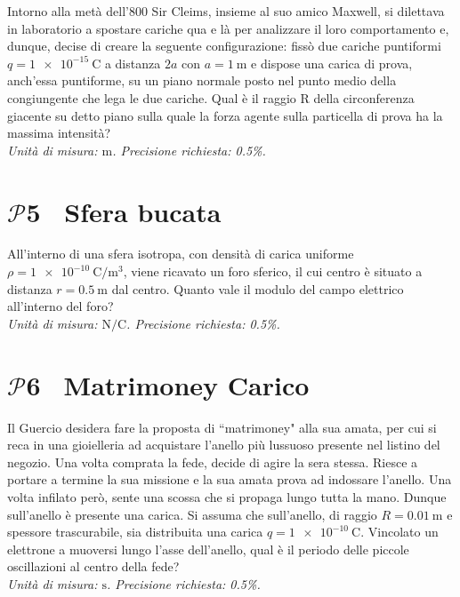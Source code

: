 \documentclass[a4paper,12pt]{article}
\newcommand{\problemtitle}[1]{
  \noindent
  \textbf{\Large #1}\hspace{0.5em}
  \raisebox{0.6ex}{\rule{\linewidth - \widthof{\textbf{\Large #1}} - 0.6em}{0.4pt}}%
}
\begin{document}
Intorno alla metà dell'800 Sir Cleims, insieme al suo amico Maxwell, si dilettava in laboratorio a spostare cariche qua e là per analizzare il loro comportamento e, dunque,  decise di creare la seguente configurazione: fissò due cariche puntiformi $q=\SI{1e-15}{\coulomb}$ a distanza $2a$ con $a=\SI{1}{\meter}$ e dispose una carica di prova, anch'essa puntiforme, su un piano normale posto nel punto medio della congiungente che lega le due cariche. Qual è il raggio R della circonferenza giacente su detto piano sulla quale  la forza agente sulla particella di prova ha la massima intensità?\\

\textit{Unità di misura: $\si{\meter}$. Precisione richiesta: 0.5\%.}

\section*{\problemtitle{$\mathcal{P}${\small{5}} \ Sfera bucata}}

All’interno di una sfera isotropa, con densità di carica uniforme $\rho=\SI{1e-10}{\coulomb\per\meter\cubed}$, viene ricavato un foro sferico, il cui centro è situato a distanza $r=\SI{0.5}{\meter}$ dal centro. Quanto vale il modulo del campo elettrico all'interno del foro?\\

\textit{Unità di misura: $\si{\newton\per\coulomb}$. Precisione richiesta: 0.5\%.}

\section*{\problemtitle{$\mathcal{P}${\small{6}} \, Matrimoney Carico}}
Il Guercio desidera fare la proposta di “matrimoney" alla sua amata, per cui si reca in una gioielleria ad acquistare l'anello più lussuoso presente nel listino del negozio. Una volta comprata la fede, decide di agire la sera stessa. Riesce a portare a termine la sua missione e la sua amata prova ad indossare l'anello. Una volta infilato però, sente una scossa che si propaga lungo tutta la mano. Dunque sull'anello  è presente una carica. Si assuma che sull'anello, di raggio $R=\SI{0.01}{\meter}$ e spessore trascurabile, sia distribuita una carica $q=\SI{1e-10}{\coulomb}$. Vincolato un elettrone a muoversi lungo l'asse dell'anello, qual è il periodo delle piccole oscillazioni al centro della fede?\\  

\textit{Unità di misura: $\si{\second}$. Precisione richiesta: 0.5\%.}
\end{document}
